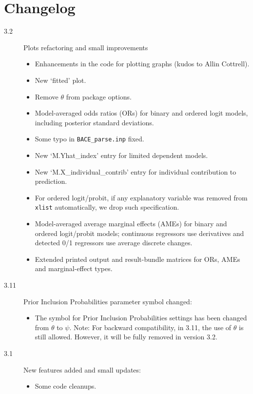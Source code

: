 \documentclass[a4paper]{BACE}
\begin{document}
	\section*{Changelog}
	\begin{description}
		\item[3.2] Plots refactoring and small improvements
			\begin{itemize}[label={--}]
				\item Enhancements in the code for plotting graphs
					(kudos to Allin Cottrell).
				\item New `fitted' plot.
				\item Remove $\theta$ from package options.
				\item Model-averaged odds ratios (ORs) for binary and
					ordered logit models, including posterior standard deviations.
				\item Some typo in \texttt{BACE\_parse.inp} fixed.
				\item New `M.Yhat\_index' entry for limited dependent models.
				\item New `M.X\_individual\_contrib' entry for individual contribution to prediction.
				\item For ordered logit/probit, if any explanatory variable was removed from
					\texttt{xlist} automatically, we drop such specification.
				\item Model-averaged average marginal effects (AMEs) for
					binary and ordered logit/probit models; continuous
					regressors use derivatives and detected 0/1 regressors
					use average discrete changes.
				\item Extended printed output and result-bundle matrices
					for ORs, AMEs and marginal-effect types.
			\end{itemize}
		\item[3.11] Prior Inclusion Probabilities parameter symbol changed:
			\begin{itemize}[label={--}]
				\item The symbol for Prior Inclusion Probabilities settings
					has been changed from $\theta$ to $\psi$. Note: For backward
					compatibility, in  3.11, the use of $\theta$ is
					still allowed. However, it will be fully removed in version 3.2.
			\end{itemize}
		\item[3.1] New features added and small updates:
			\begin{itemize}[label={--}]
				\item Some code cleanups.

\end{itemize}
\end{description}
\end{document}
